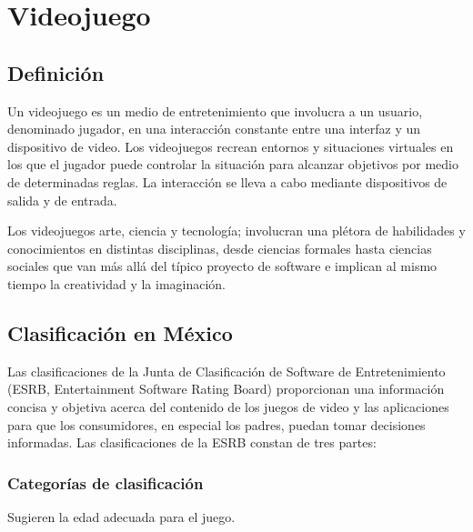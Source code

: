 \documentclass{article}
\begin{document}
\section{Videojuego}
			\subsection{Definición}
			Un videojuego es un medio de entretenimiento
			que involucra a un usuario, denominado jugador, en
			una interacción constante entre una interfaz y un
			dispositivo de video. Los videojuegos recrean
			entornos y situaciones virtuales en los que el jugador
			puede controlar la situación para
			alcanzar objetivos por medio de determinadas reglas.
			La interacción se lleva a cabo mediante
			dispositivos de salida y de entrada.
		
			Los videojuegos arte, ciencia y tecnología;
			involucran una plétora de habilidades y
			conocimientos en distintas disciplinas, desde ciencias
			formales hasta ciencias sociales que van más allá del
			típico proyecto de software e implican al mismo
			tiempo la creatividad y la imaginación.
			
			\subsection{Clasificación en México}
			Las clasificaciones de la Junta de Clasificación de Software de Entretenimiento (ESRB, Entertainment Software Rating Board) proporcionan una información concisa y objetiva acerca del contenido de los juegos de video y las aplicaciones para que los consumidores, en especial los padres, puedan tomar decisiones informadas. Las clasificaciones de la ESRB constan de tres partes:
			
			\subsubsection{Categorías de clasificación}
			 Sugieren la edad adecuada para el juego.
			
\end{document}
